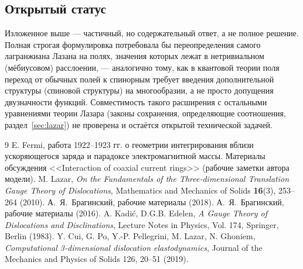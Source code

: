 \documentclass[12pt,a4paper]{article}
\begin{document}
\subsection{Открытый статус}

Изложенное выше --- частичный, но содержательный ответ, а не полное
решение. Полная строгая формулировка потребовала бы переопределения
самого лагранжиана Лазана на полях, значения которых лежат в
нетривиальном (мёбиусовом) расслоении, --- аналогично тому, как в
квантовой теории поля переход от обычных полей к спинорным требует
введения дополнительной структуры (спиновой структуры) на многообразии,
а не просто допущения двузначности функций. Совместимость такого
расширения с остальными уравнениями теории Лазара
(законы сохранения, определяющие соотношения, раздел~\ref{sec:lazar})
не проверена и остаётся открытой технической задачей.

\begin{thebibliography}{9}
 E. Fermi, работа 1922--1923 гг. о геометрии
интегрирования вблизи ускоряющегося заряда и парадоксе
электромагнитной массы.
 Материалы обсуждения <<Interaction of coaxial current
rings>> (рабочие заметки автора модели).
 M. Lazar, {\it On the Fundamentals of the
Three-dimensional Translation Gauge Theory of Dislocations},
Mathematics and Mechanics of Solids {\bf 16}(3), 253--264 (2010).
 А.~Я.~Брагинский, рабочие материалы (2018).
 А.~Я.~Брагинский, рабочие материалы (2016).
 A. Kadi\'c, D.G.B. Edelen, {\it A Gauge
Theory of Dislocations and Disclinations}, Lecture Notes in Physics,
Vol. 174, Springer, Berlin (1983).
 Y. Cui, G. Po, Y.-P. Pellegrini, M. Lazar, N. Ghoniem, {\it Computational 3-dimensional dislocation elastodynamics}, Journal of the Mechanics and Physics of Solids 126, 20--51 (2019).
\end{thebibliography}
\end{document}
